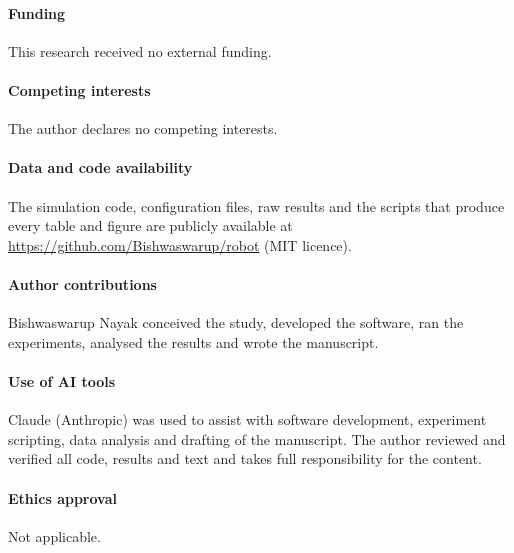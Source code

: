 \paragraph{Funding} This research received no external funding.

\paragraph{Competing interests} The author declares no competing interests.

\paragraph{Data and code availability} The simulation code, configuration files, raw results and the
scripts that produce every table and figure are publicly available at
\url{https://github.com/Bishwaswarup/robot} (MIT licence).

\paragraph{Author contributions} Bishwaswarup Nayak conceived the study, developed the software, ran the
experiments, analysed the results and wrote the manuscript.

\paragraph{Use of AI tools} Claude (Anthropic) was used to assist with software development, experiment
scripting, data analysis and drafting of the manuscript. The author reviewed and verified all code, results
and text and takes full responsibility for the content.

\paragraph{Ethics approval} Not applicable.
